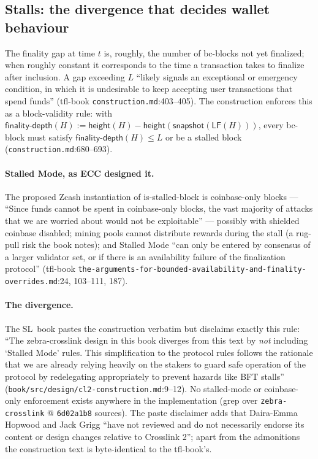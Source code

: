 \documentclass[11pt,a4paper]{article}
\theoremstyle{definition}
\begin{document}
\subsection{Stalls: the divergence that decides wallet behaviour}
\label{sec:xl-stalls}

The finality gap at time $t$ is, roughly, the number of bc-blocks not yet
finalized; when roughly constant it corresponds to the time a transaction
takes to finalize after inclusion. A gap exceeding $L$ ``likely signals an
exceptional or emergency condition, in which it is undesirable to keep
accepting user transactions that spend funds'' (tfl-book
\texttt{construction.md}:403--405). The construction enforces this as a
block-validity rule: with $\mathsf{finality\text{-}depth}(H) :=
\mathsf{height}(H) - \mathsf{height}(\mathsf{snapshot}(\mathsf{LF}(H)))$,
every bc-block must satisfy $\mathsf{finality\text{-}depth}(H) \le L$ or
be a stalled block (\texttt{construction.md}:680--693).

\paragraph{Stalled Mode, as ECC designed it.} The proposed Zcash
instantiation of \textsf{is-stalled-block} is coinbase-only blocks ---
``Since funds cannot be spent in coinbase-only blocks, the vast majority
of attacks that we are worried about would not be exploitable'' ---
possibly with shielded coinbase disabled; mining pools cannot distribute
rewards during the stall (a rug-pull risk the book notes); and Stalled
Mode ``can only be entered by consensus of a larger validator set, or if
there is an availability failure of the finalization protocol'' (tfl-book
\texttt{the-arguments-for-bounded-availability-and-finality-overrides.md}:24,
103--111, 187).

\paragraph{The divergence.} The SL~book pastes the construction verbatim
but disclaims exactly this rule: ``The zebra-crosslink design in this book
diverges from this text by \emph{not} including `Stalled Mode' rules. This
simplification to the protocol rules follows the rationale that we are
already relying heavily on the stakers to guard safe operation of the
protocol by redelegating appropriately to prevent hazards like BFT
stalls'' (\texttt{book/src/design/cl2-construction.md}:9--12). No
stalled-mode or coinbase-only enforcement exists anywhere in the
implementation (grep over \texttt{zebra-crosslink} @ \texttt{6d02a1b8}
sources). The paste disclaimer adds that Daira-Emma Hopwood and Jack
Grigg ``have not reviewed and do not necessarily endorse its content or
design changes relative to Crosslink 2''; apart from the admonitions the
construction text is byte-identical to the tfl-book's.
\end{document}
